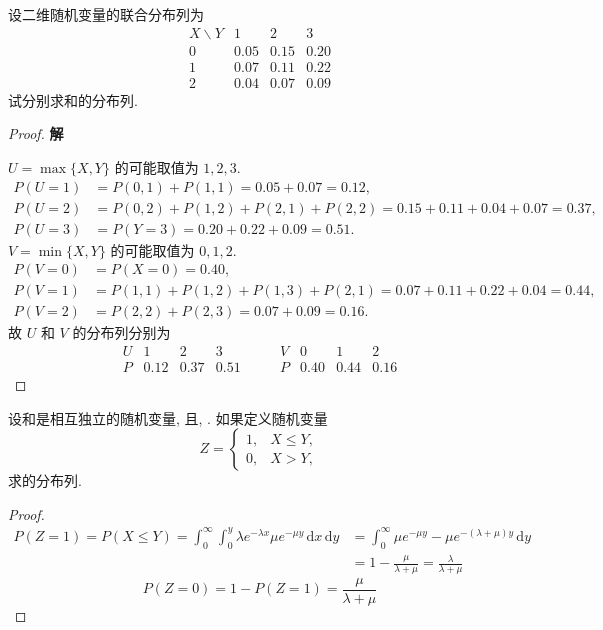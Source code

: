 \documentclass[../main.tex]{subfiles}
\begin{document}
\begin{exercise}{}{}
设二维随机变量的联合分布列为
\[
\begin{array}{c|ccc}
X\backslash Y & 1 & 2 & 3\\ \hline
0 & 0.05 & 0.15 & 0.20\\
1 & 0.07 & 0.11 & 0.22\\
2 & 0.04 & 0.07 & 0.09
\end{array}
\]
试分别求和的分布列.
\end{exercise}
\begin{proof}
    \textbf{解}

\(U=\max\{X,Y\}\) 的可能取值为 \(1, 2, 3\).
\[
\begin{aligned}
P(U=1) &= P(0,1) + P(1,1) = 0.05 + 0.07 = 0.12, \\
P(U=2) &= P(0,2) + P(1,2) + P(2,1) + P(2,2) = 0.15 + 0.11 + 0.04 + 0.07 = 0.37, \\
P(U=3) &= P(Y=3) = 0.20 + 0.22 + 0.09 = 0.51.
\end{aligned}
\]
\(V=\min\{X,Y\}\) 的可能取值为 \(0, 1, 2\).
\[
\begin{aligned}
P(V=0) &= P(X=0) = 0.40, \\
P(V=1) &= P(1,1) + P(1,2) + P(1,3) + P(2,1) = 0.07 + 0.11 + 0.22 + 0.04 = 0.44, \\
P(V=2) &= P(2,2) + P(2,3) = 0.07 + 0.09 = 0.16.
\end{aligned}
\]
故 \(U\) 和 \(V\) 的分布列分别为
\[
\begin{array}{c|ccc}
U & 1 & 2 & 3 \\ \hline
P & 0.12 & 0.37 & 0.51
\end{array}
\qquad
\begin{array}{c|ccc}
V & 0 & 1 & 2 \\ \hline
P & 0.40 & 0.44 & 0.16
\end{array}
\]
\end{proof}
\begin{exercise}{}{}
设和是相互独立的随机变量, 且, . 如果定义随机变量
\[
Z=
\begin{cases}
1, & X\le Y,\\
0, & X>Y,
\end{cases}
\]
求的分布列.
\end{exercise}
\begin{proof}
     \[
  \begin{aligned}
     P\left( Z= 1 \right)= P\left( X\le Y \right)= \int_{0}^{\infty}\int_{0}^{y} \lambda e^{- \lambda x }\mu e^{-\mu y}\,\mathrm{d} x\,\mathrm{d} y&= \int_{0}^{\infty}  \mu e^{-\mu y}-\mu e^{-\left(  \lambda + \mu  \right)y }\,\mathrm{d} y\\ 
      &=     1 -  \frac{\mu  }{ \lambda + \mu  } = \frac{ \lambda  }{ \lambda + \mu  } 
  \end{aligned}
     \] \[
     P\left( Z= 0 \right)= 1-P\left( Z= 1 \right)= \frac{\mu  }{ \lambda + \mu  } 
     \]
\end{proof}
\end{document}
